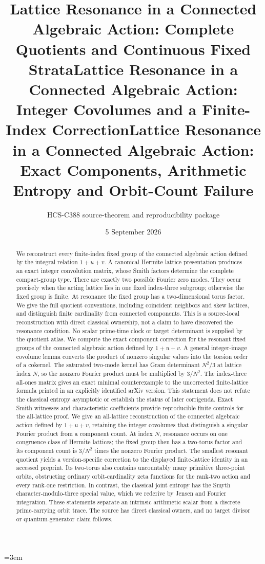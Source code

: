 \documentclass[10pt]{article}
\title{Lattice Resonance in a Connected Algebraic Action: Complete Quotients and Continuous Fixed Strata}
\title{Lattice Resonance in a Connected Algebraic Action: Integer Covolumes and a Finite-Index Correction}
\title{Lattice Resonance in a Connected Algebraic Action: Exact Components, Arithmetic Entropy and Orbit-Count Failure}
\author{HCS-C388 source-theorem and reproducibility package}
\date{5 September 2026}
\begin{document}
\emergencystretch=3em
\maketitle
\begin{abstract}
\ifcase\CRevisionRound
We reconstruct every finite-index fixed group of the connected algebraic
action defined by the integral relation $1+u+v$. A canonical Hermite lattice
presentation produces an exact integer convolution matrix, whose Smith
factors determine the complete compact-group type. There are exactly two
possible Fourier zero modes. They occur precisely when the acting lattice
lies in one fixed index-three subgroup; otherwise the fixed group is finite.
At resonance the fixed group has a two-dimensional torus factor. We give
the full quotient conventions, including coincident neighbors and skew
lattices, and distinguish finite cardinality from connected components.
This is a source-local reconstruction with direct classical ownership,
not a claim to have discovered the resonance condition. No scalar
prime-time clock or target determinant is supplied by the quotient atlas.
\or
We compute the exact component correction for the resonant fixed groups
of the connected algebraic action defined by $1+u+v$. A general integer-image
covolume lemma converts the product of nonzero singular values into the
torsion order of a cokernel. The saturated two-mode kernel has Gram
determinant $N^2/3$ at lattice index $N$, so the nonzero Fourier product
must be multiplied by $3/N^2$. The index-three all-ones matrix gives an
exact minimal counterexample to the uncorrected finite-lattice formula
printed in an explicitly identified arXiv version. This statement does
not refute the classical entropy asymptotic or establish the status of
later corrigenda. Exact Smith witnesses and characteristic coefficients
provide reproducible finite controls for the all-lattice proof.
\else
We give an all-lattice reconstruction of the connected algebraic action
defined by $1+u+v$, retaining the integer covolumes that distinguish a
singular Fourier product from a component count. At index $N$, resonance
occurs on one congruence class of Hermite lattices; the fixed group then
has a two-torus factor and its component count is $3/N^2$ times the nonzero
Fourier product. The smallest resonant quotient yields a version-specific
correction to the displayed finite-lattice identity in an accessed preprint. Its two-torus
also contains uncountably many primitive three-point orbits, obstructing
ordinary orbit-cardinality zeta functions for the rank-two action and every
rank-one restriction. In contrast, the classical joint entropy has the
Smyth character-modulo-three special value, which we rederive by Jensen
and Fourier integration. These statements separate an intrinsic arithmetic
scalar from a discrete prime-carrying orbit trace. The source has direct
classical owners, and no target divisor or quantum-generator claim follows.
\fi
\end{abstract}
\end{document}
